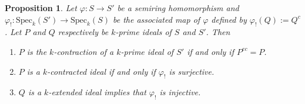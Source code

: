 \documentclass[11pt,english]{amsart}
\newtheorem{proposition}[theorem]{Proposition}
\theoremstyle{definition}
\numberwithin{equation}{section}
\begin{document}
\begin{proposition}\label{contraction of k-prime ideals}
Let $\varphi\colon S\to S'$ be a semiring homomorphism and $\varphi_{!} \colon \mathrm{Spec}_k(S') \to \mathrm{Spec}_k(S)$ be the associated map of $\varphi$ defined by $\varphi_!(Q):=Q^c$. Let $P$ and $Q$ respectively be $k$-prime ideals of $S$ and $S'$. Then 
\begin{enumerate}
\item $P$ is the $k$-contraction of a $k$-prime ideal of $S'$ if and only if $P^{ec}=P$.
		
\item   $P$ is a $k$-contracted ideal if and only if  $\varphi_!$ is surjective.
		
\item $Q$ is a $k$-extended ideal implies that $\varphi_!$ is injective.
\end{enumerate}
\end{proposition}
\end{document}
